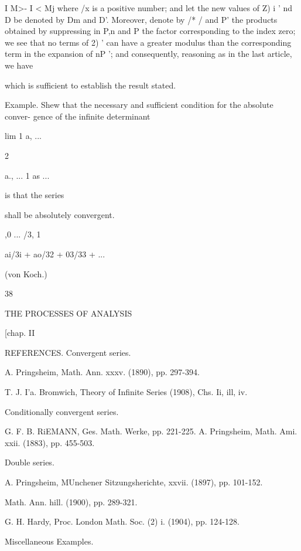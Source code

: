 I M>- I < Mj where /x is a positive number; and let the new values of
Z) i ' nd D be denoted by Dm and D'. Moreover, denote by /* / and P'
the products obtained by suppressing in P,n and P the factor
corresponding to the index zero; we see that no terms of 2) ' can
have a greater modulus than the corresponding term in the expansion of
nP '; and consequently, reasoning as in the last article, we have

which is sufficient to establish the result stated.

Example. Shew that the necessary and sufficient condition for the
absolute conver- gence of the infinite determinant

lim 1 a, ...



 2



a., ... 1 as ...



is that the series

shall be absolutely convergent.



,0 ... /3, 1

ai/3i + ao/32 + 03/33 + ...



(von Koch.)



38



THE PROCESSES OF ANALYSIS



[chap. II



REFERENCES. Convergent series.

A. Pringsheim, Math. Ann. xxxv. (1890), pp. 297-394.

T. J. I'a. Bromwich, Theory of Infinite Series (1908), Chs. Ii, ill,
iv.

Conditionally convergent series.

G. F. B. RiEMANN, Ges. Math. Werke, pp. 221-225. A. Pringsheim, Math.
Ami. xxii. (1883), pp. 455-503.

Double series.

A. Pringsheim, MUnchener Sitzungsherichte, xxvii. (1897), pp. 101-152.

    Math. Ann. hill. (1900), pp. 289-321.

G. H. Hardy, Proc. London Math. Soc. (2) i. (1904), pp. 124-128.



Miscellaneous Examples.

